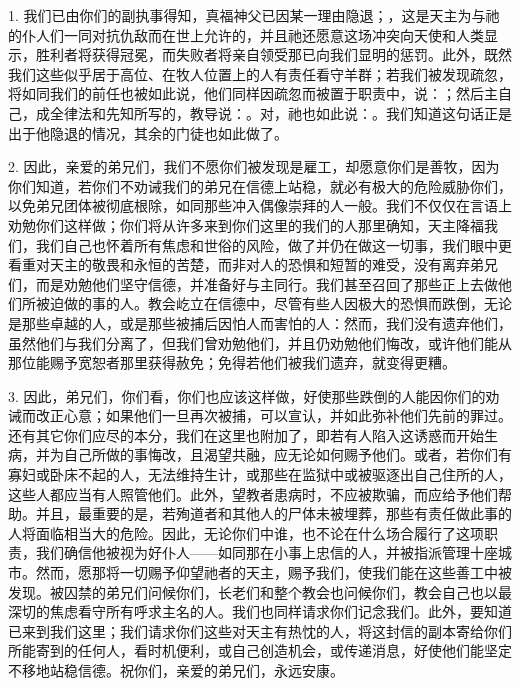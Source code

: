 1. 我们已由你们的副执事得知，真福神父已因某一理由隐退；，这是天主为与祂的仆人们一同对抗仇敌而在世上允许的，并且祂还愿意这场冲突向天使和人类显示，胜利者将获得冠冕，而失败者将亲自领受那已向我们显明的惩罚。此外，既然我们这些似乎居于高位、在牧人位置上的人有责任看守羊群；若我们被发现疏忽，将如同我们的前任也被如此说，他们同样因疏忽而被置于职责中，说：；然后主自己，成全律法和先知所写的，教导说：。对，祂也如此说：。我们知道这句话正是出于他隐退的情况，其余的门徒也如此做了。\par

2. 因此，亲爱的弟兄们，我们不愿你们被发现是雇工，却愿意你们是善牧，因为你们知道，若你们不劝诫我们的弟兄在信德上站稳，就必有极大的危险威胁你们，以免弟兄团体被彻底根除，如同那些冲入偶像崇拜的人一般。我们不仅仅在言语上劝勉你们这样做；你们将从许多来到你们这里的我们的人那里确知，天主降福我们，我们自己也怀着所有焦虑和世俗的风险，做了并仍在做这一切事，我们眼中更看重对天主的敬畏和永恒的苦楚，而非对人的恐惧和短暂的难受，没有离弃弟兄们，而是劝勉他们坚守信德，并准备好与主同行。我们甚至召回了那些正上去做他们所被迫做的事的人。教会屹立在信德中，尽管有些人因极大的恐惧而跌倒，无论是那些卓越的人，或是那些被捕后因怕人而害怕的人：然而，我们没有遗弃他们，虽然他们与我们分离了，但我们曾劝勉他们，并且仍劝勉他们悔改，或许他们能从那位能赐予宽恕者那里获得赦免；免得若他们被我们遗弃，就变得更糟。\par

3. 因此，弟兄们，你们看，你们也应该这样做，好使那些跌倒的人能因你们的劝诫而改正心意；如果他们一旦再次被捕，可以宣认，并如此弥补他们先前的罪过。还有其它你们应尽的本分，我们在这里也附加了，即若有人陷入这诱惑而开始生病，并为自己所做的事悔改，且渴望共融，应无论如何赐予他们。或者，若你们有寡妇或卧床不起的人，无法维持生计，或那些在监狱中或被驱逐出自己住所的人，这些人都应当有人照管他们。此外，望教者患病时，不应被欺骗，而应给予他们帮助。并且，最重要的是，若殉道者和其他人的尸体未被埋葬，那些有责任做此事的人将面临相当大的危险。因此，无论你们中谁，也不论在什么场合履行了这项职责，我们确信他被视为好仆人——如同那在小事上忠信的人，并被指派管理十座城市。然而，愿那将一切赐予仰望祂者的天主，赐予我们，使我们能在这些善工中被发现。被囚禁的弟兄们问候你们，长老们和整个教会也问候你们，教会自己也以最深切的焦虑看守所有呼求主名的人。我们也同样请求你们记念我们。此外，要知道已来到我们这里；我们请求你们这些对天主有热忱的人，将这封信的副本寄给你们所能寄到的任何人，看时机便利，或自己创造机会，或传递消息，好使他们能坚定不移地站稳信德。祝你们，亲爱的弟兄们，永远安康。\par

